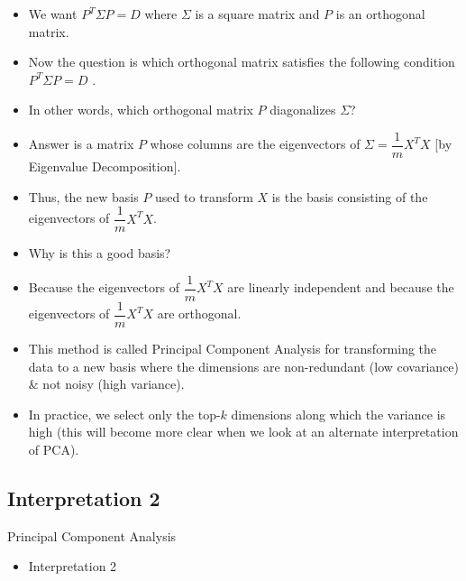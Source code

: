 \documentclass[10pt, aspectratio=169]{beamer}
\begin{document}
\begin{frame}
\begin{itemize}
\item<1-> We want $P^T \Sigma P = D$ where $\Sigma$ is a square matrix and $P$ is an orthogonal matrix.

\item<2-> Now the question is which orthogonal matrix satisfies the following condition $P^T \Sigma P = D $ .

\item<3-> In other words, which orthogonal matrix $P$ diagonalizes $\Sigma$? 

\item<4-> Answer is a matrix $P$ whose columns are the eigenvectors of $\Sigma = \dfrac{1}{m} X^T X$ [by Eigenvalue Decomposition]. \\

\item<5-> Thus, the new basis $P$ used to transform $X$ is the basis consisting of the eigenvectors of $\dfrac{1}{m} X^T X$. \\
\end{itemize}
\end{frame}

\begin{frame}
\begin{itemize}
\item<1-> Why is this a good basis? 
\item<2-> Because the eigenvectors of $\dfrac{1}{m}X^T X$ are linearly independent and because the eigenvectors of $\dfrac{1}{m}X^T X$ are orthogonal.

\item<3-> This method is called Principal Component Analysis for transforming the data to a new basis where the dimensions are non-redundant (low covariance) \& not noisy (high variance).

\item<4-> In practice, we select only the top-$k$ dimensions along which the variance is high (this will become more clear when we look at an alternate interpretation of PCA).
\end{itemize}
\end{frame}


\subsection{Interpretation 2}
\begin{frame}{Principal Component Analysis}
\begin{itemize}
\item Interpretation 2
\end{itemize}
\end{frame}
\end{document}
